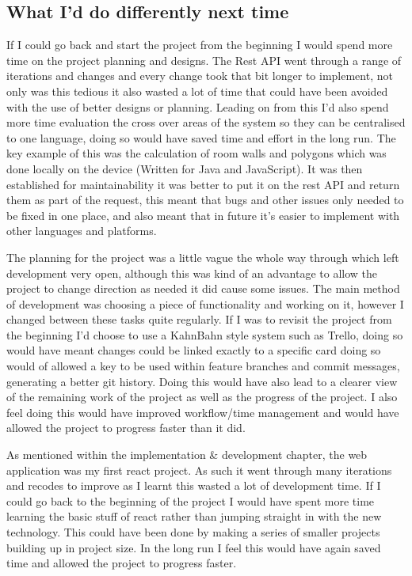 \subsection{What I'd do differently next time}
If I could go back and start the project from the beginning I would spend more time on the project planning and designs. The Rest API went through a range of iterations and changes and every change took that bit longer to implement, not only was this tedious it also wasted a lot of time that could have been avoided with the use of better designs or planning. Leading on from this I'd also spend more time evaluation the cross over areas of the system so they can be centralised to one language, doing so would have saved time and effort in the long run. The key example of this was the calculation of room walls and polygons which was done locally on the device (Written for Java and JavaScript). It was then established for maintainability it was better to put it on the rest API and return them as part of the request, this meant that bugs and other issues only needed to be fixed in one place, and also meant that in future it's easier to implement with other languages and platforms.

The planning for the project was a little vague the whole way through which left development very open, although this was kind of an advantage to allow the project to change direction as needed it did cause some issues. The main method of development was choosing a piece of functionality and working on it, however I changed between these tasks quite regularly. If I was to revisit the project from the beginning I'd choose to use a KahnBahn style system such as Trello, doing so would have meant changes could be linked exactly to a specific card doing so would of allowed a key to be used within feature branches and commit messages, generating a better git history. Doing this would have also lead to a clearer view of the remaining work of the project as well as the progress of the project. I also feel doing this would have improved workflow/time management and would have allowed the project to progress faster than it did. 

As mentioned within the implementation \& development chapter, the web application was my first react project. As such it went through many iterations and recodes to improve as I learnt this wasted a lot of development time. If I could go back to the beginning of the project I would have spent more time learning the basic stuff of react rather than jumping straight in with the new technology. This could have been done by making a series of smaller projects building up in project size. In the long run I feel this would have again saved time and allowed the project to progress faster.

